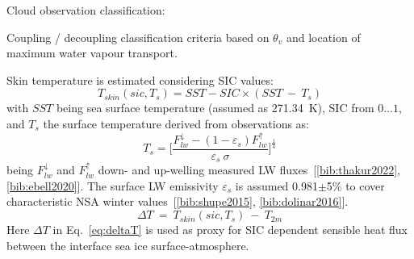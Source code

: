 \documentclass[portrate,paperwidth=841mm,paperheight=1189mm,fontscale=0.4,margin=1cm]{baposter}
\begin{document}
\begin{poster}
{\colouredcircle Cloud observation classification:\\
\begin{minipage}{0.9\textwidth}
	\centering
	\caption{\small Coupling / decoupling classification criteria based on $\theta_v$ and location of maximum water vapour transport.}
	\label{fig:cop-dec}
\end{minipage}


\colouredcircle Skin temperature is estimated considering SIC values:
\begin{equation}
	T_{skin}(sic, T_s) = SST - SIC\times(SST~-~T_s)
	\label{eq:Tskin}
\end{equation}
with $SST$ being sea surface temperature (assumed as 271.34~K), SIC from $0\dots1$, and $T_s$ the surface temperature derived from observations as:
\[
	T_s = \Big[ \frac{F_{lw}^{\downarrow} - (1-\varepsilon_s)F_{lw}^{\uparrow}}{\varepsilon_s~\sigma} \Big]^{\frac{1}{4}}
\]
being $F_{lw}^{\downarrow}$ and $F_{lw}^{\uparrow}$ down- and up-welling measured LW fluxes~[\ref{bib:thakur2022}, \ref{bib:ebell2020}]. The surface LW emissivity $\varepsilon_s$ is assumed 0.981$\pm$5\% to cover characteristic NSA winter values~[\ref{bib:shupe2015}, \ref{bib:dolinar2016}].
\begin{equation}
	\Delta T~=~T_{skin}(sic, T_s)~-~T_{2m}
	\label{eq:deltaT}
\end{equation}
Here $\Delta T$ in Eq.~\ref{eq:deltaT} is used as proxy for SIC dependent sensible heat flux between the interface sea ice surface-atmosphere. %

} %


\end{poster}
\end{document}
